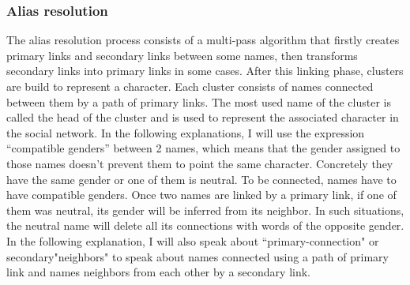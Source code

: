 \documentclass[a4paper, 12pt]{report}
\begin{document}
\subsubsection{Alias resolution}
\label{section:alias}
The alias resolution process consists of a multi-pass algorithm that firstly creates primary links and secondary links between some names,
then transforms secondary links into primary links in some cases.
After this linking phase, clusters are build to represent a character.
Each cluster consists of names connected between them by a path of primary links.
The most used name of the cluster is called the head of the cluster and is used to represent the associated character in the social network.
In the following explanations, I will use the expression ``compatible genders'' between 2 names,
which means that the gender assigned to those names doesn't prevent them to point the same character.
Concretely they have the same gender or one of them is neutral. To be connected, names have to have compatible genders.
Once two names are linked by a primary link, if one of them was neutral, its gender will be inferred from its neighbor.
In such situations, the neutral name will delete all its connections with words of the opposite gender.
In the following explanation, I will also speak about ``primary-connection" or secondary"neighbors" to speak about names connected using a path of primary link
and names neighbors from each other by a secondary link. \\
\end{document}
